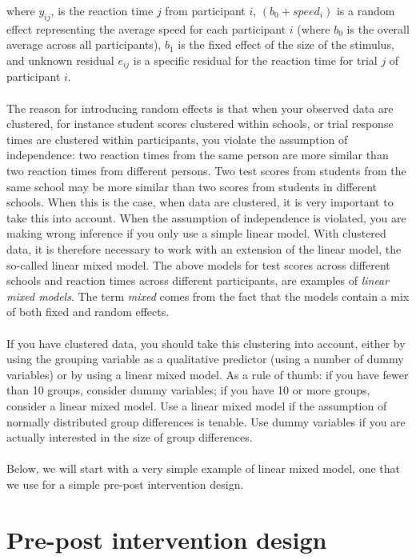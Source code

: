 \documentclass[]{report}\usepackage[]{graphicx}\usepackage[]{color}
\begin{document}
where $y_{ij}$, is the reaction time $j$ from participant $i$, $(b_0 + speed_i)$ is a random effect representing the average speed for each participant $i$ (where $b_0$ is the overall average across all participants), $b_1$ is the fixed effect of the size of the stimulus, and unknown residual $e_{ij}$ is a specific residual for the reaction time for trial $j$ of participant $i$.
\\
\\
The reason for introducing random effects is that when your observed data are clustered, for instance student scores clustered within schools, or trial response times are clustered within participants, you violate the assumption of independence: two reaction times from the same person are more similar than two reaction times from different persons. Two test scores from students from the same school may be more similar than two scores from students in different schools. When this is the case, when data are clustered, it is very important to take this into account. When the assumption of independence is violated, you are making wrong inference if you only use a simple linear model. With clustered data, it is therefore necessary to work with an extension of the linear model, the so-called linear mixed model. The above models for test scores across different schools and reaction times across different participants, are examples of \textit{linear mixed models}. The term \textit{mixed} comes from the fact that the models contain a mix of both fixed and random effects. 
\\
\\
If you have clustered data, you should take this clustering into account, either by using the grouping variable as a qualitative predictor (using a number of dummy variables) or by using a linear mixed model. As a rule of thumb: if you have fewer than 10 groups, consider dummy variables; if you have 10 or more groups, consider a linear mixed model. Use a linear mixed model if the assumption of normally distributed group differences is tenable. Use dummy variables if you are actually interested in the size of group differences.
\\
\\
Below, we will start with a very simple example of linear mixed model, one that we use for a simple pre-post intervention design.



\section{Pre-post intervention design}
\end{document}
